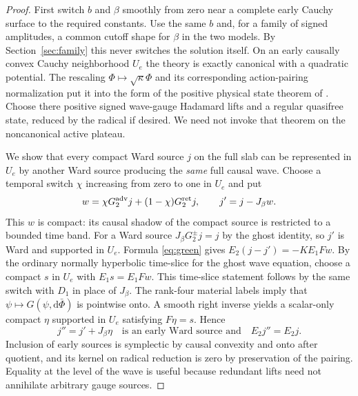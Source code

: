 \documentclass[11pt]{article}
\newcommand{\dd}{\mathrm d}
\begin{document}
\begin{proof}
First switch $b$ and $\beta$ smoothly from zero near a complete early Cauchy surface to the required constants. Use the same $b$ and, for a family of signed amplitudes, a common cutoff shape for $\beta$ in the two models. By Section~\ref{sec:family} this never switches the solution itself. On an early causally convex Cauchy neighborhood $U_e$ the theory is exactly canonical with a quadratic potential. The rescaling $\Phi\mapsto\sqrt\kappa\Phi$ and its corresponding action-pairing normalization put it into the form of the positive physical state theorem of \cite{P09}. Choose there positive signed wave-gauge Hadamard lifts and a regular quasifree state, reduced by the radical if desired. We need not invoke that theorem on the noncanonical active plateau.

We show that every compact Ward source $j$ on the full slab can be represented in $U_e$ by another Ward source producing the \emph{same} full causal wave. Choose a temporal switch $\chi$ increasing from zero to one in $U_e$ and put
\[
 w=\chi G_2^{\rm adv}j+(1-\chi)G_2^{\rm ret}j,\qquad j'=j-J_\beta w.
\]
This $w$ is compact: its causal shadow of the compact source is restricted to a bounded time band. For a Ward source $J_\beta G_2^\pm j=j$ by the ghost identity, so $j'$ is Ward and supported in $U_e$. Formula \eqref{eq:green} gives $E_2(j-j')=-K E_1 Fw$. By the ordinary normally hyperbolic time-slice for the ghost wave equation, choose a compact $s$ in $U_e$ with $E_1s=E_1Fw$. This time-slice statement follows by the same switch with $D_1$ in place of $J_\beta$. The rank-four material labels imply that $\psi\mapsto G(\psi,\dd\bar\Phi)$ is pointwise onto. A smooth right inverse yields a scalar-only compact $\eta$ supported in $U_e$ satisfying $F\eta=s$. Hence
\[
 j''=j'+J_\beta\eta\quad\text{is an early Ward source and}\quad E_2j''=E_2j.
\]
Inclusion of early sources is symplectic by causal convexity and onto after quotient, and its kernel on radical reduction is zero by preservation of the pairing. Equality at the level of the wave is useful because redundant lifts need not annihilate arbitrary gauge sources.


\end{proof}
\end{document}
